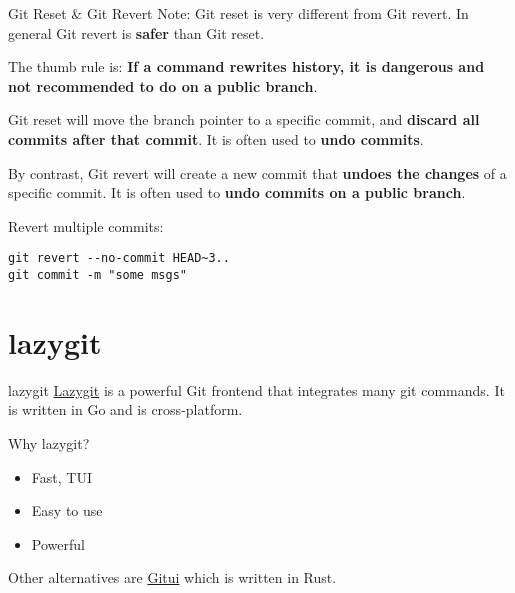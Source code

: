 \documentclass[aspectratio=169]{beamer}
\begin{document}
\begin{frame}[fragile]{Git Reset \& Git Revert}
    Note: Git reset is very different from Git revert.
    In general Git revert is \textbf{safer} than Git reset.

    \pause

    The thumb rule is: \textbf{If a command rewrites history, it is dangerous and not recommended to do on a public branch}.

    \pause

    Git reset will move the branch pointer to a specific commit, and \textbf{discard all commits after that commit}. It is often used to \textbf{undo commits}.

    \pause

    By contrast, Git revert will create a new commit that \textbf{undoes the changes} of a specific commit. It is often used to \textbf{undo commits on a public branch}.

    \pause
    \bigskip

    Revert multiple commits:
    \begin{verbatim}
git revert --no-commit HEAD~3..
git commit -m "some msgs"
    \end{verbatim}
\end{frame}

\section{lazygit}

\begin{frame}{lazygit}
    \href{https://github.com/jesseduffield/lazygit}{Lazygit} is a powerful Git frontend that integrates many git commands. It is written in Go and is cross-platform.

    \pause

    Why lazygit?
    \begin{itemize}
        \item Fast, TUI
        \item Easy to use
        \item Powerful
    \end{itemize}

    Other alternatives are \href{https://github.com/Extrawurst/gitui}{Gitui} which is written in Rust.
\end{frame}
\end{document}
